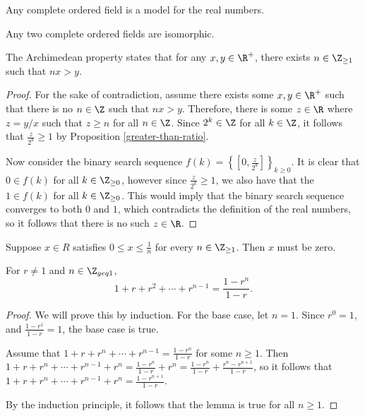 \documentclass[12pt]{article}
\begin{document}
\begin{defn}
    Any complete ordered field is a model for the real numbers.
\end{defn}

\begin{rmk}
    Any two complete ordered fields are isomorphic.
\end{rmk}

\begin{thm}
    The Archimedean property states that for any $x, y \in \R^{+}$, there exists $n \in \Z_{\geq 1}$ such that $nx > y$.
\end{thm}

\begin{proof}
    For the sake of contradiction, assume there exists some $x, y \in \R^{+}$ such that there is no $n \in \Z$ such that $nx > y$. Therefore, there is some $z \in \R$ where $z = y/x$ such that $z \geq n$ for all $n \in \Z$. Since $2^k \in \Z$ for all $k \in \Z$, it follows that $\frac{z}{2^k} \geq 1$ by Proposition \ref{greater-than-ratio}.

    Now consider the binary search sequence $f(k) = \left\{[0, \frac{z}{2^k}]\right\}_{k \geq 0}$. It is clear that $0 \in f(k)$ for all $k \in \Z_{\geq 0}$, however since $\frac{z}{2^k} \geq 1$, we also have that the $1 \in f(k)$ for all $k \in \Z_{\geq 0}$. This would imply that the binary search sequence converges to both $0$ and $1$, which contradicts the definition of the real numbers, so it follows that there is no such $z \in \R$.
\end{proof}

\begin{cor}
    Suppose $x \in R$ satisfies $0 \leq x \leq \frac{1}{n}$ for every $n \in \Z_{\geq 1}$. Then $x$ must be zero.
\end{cor}

\begin{lemma}\label{geometric-progression}
    For $r \neq 1$ and $n \in \Z_{geq 1}$, \[1 + r + r^2 + \cdots + r^{n-1} = \frac{1-r^n}{1-r}.\]
\end{lemma}

\begin{proof}
    We will prove this by induction. For the base case, let $n = 1$. Since $r^0 = 1$, and $\frac{1-r^1}{1-r} = 1$, the base case is true.

    Assume that $1 + r + r^n + \cdots + r^{n-1} = \frac{1-r^n}{1-r}$ for some $n \geq 1$. Then $1 + r + r^n + \cdots + r^{n-1} + r^n = \frac{1-r^n}{1-r} + r^n = \frac{1-r^n}{1-r} + \frac{r^n - r^{n+1}}{1-r}$, so it follows that $1 + r + r^n + \cdots + r^{n-1} + r^n = \frac   {1-r^{n+1}}{1-r}$.

    By the induction principle, it follows that the lemma is true for all $n \geq 1$.
\end{proof}
\end{document}
